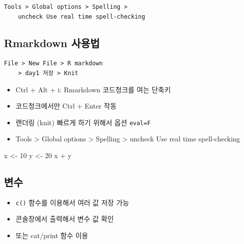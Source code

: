 \documentclass[
]{book}
\newenvironment{Shaded}{\begin{snugshade}}{\end{snugshade}}
\newcommand{\DecValTok}[1]{\textcolor[rgb]{0.00,0.00,0.81}{#1}}
\newcommand{\NormalTok}[1]{#1}
\newcommand{\OtherTok}[1]{\textcolor[rgb]{0.56,0.35,0.01}{#1}}
\newcommand{\SpecialCharTok}[1]{\textcolor[rgb]{0.00,0.00,0.00}{#1}}
\providecommand{\tightlist}{%
  \setlength{\itemsep}{0pt}\setlength{\parskip}{0pt}}
\begin{document}
\begin{verbatim}
Tools > Global options > Spelling >
    uncheck Use real time spell-checking 
\end{verbatim}

\hypertarget{rmarkdown-uxc0acuxc6a9uxbc95}{%
\subsection{Rmarkdown 사용법}\label{rmarkdown-uxc0acuxc6a9uxbc95}}

\begin{verbatim}
File > New File > R markdown 
    > day1 저장 > Knit
\end{verbatim}

\begin{itemize}
\tightlist
\item
  Ctrl + Alt + i: Rmarkdown 코드청크를 여는 단축키
\item
  코드청크에서만 Ctrl + Enter 작동
\item
  랜더링 (knit) 빠르게 하기 위해서 옵션 \texttt{eval=F}
\item
  Tools \textgreater{} Global options \textgreater{} Spelling \textgreater{} uncheck Use real time spell-checking
\end{itemize}

\begin{Shaded}
\begin{Highlighting}[]
\NormalTok{x }\OtherTok{\textless{}{-}} \DecValTok{10}
\NormalTok{y }\OtherTok{\textless{}{-}} \DecValTok{20}
\NormalTok{x }\SpecialCharTok{+}\NormalTok{ y}
\end{Highlighting}
\end{Shaded}

\hypertarget{uxbcc0uxc218}{%
\subsection{변수}\label{uxbcc0uxc218}}

\begin{itemize}
\tightlist
\item
  \texttt{c()} 함수를 이용해서 여러 값 저장 가능
\item
  콘솔창에서 출력해서 변수 값 확인
\item
  또는 cat/print 함수 이용
\end{itemize}
\end{document}

